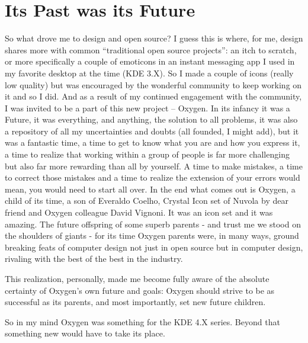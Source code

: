 \section*{Its Past was its Future}
So what drove me to design and open source? 
I guess this is where, for me, design shares more with common “traditional open source projects”: an itch to scratch, or more specifically a couple of emoticons in an instant messaging app I used in my favorite desktop at the time (KDE 3.X). So I made a couple of icons (really low quality) but was encouraged by the wonderful community to keep working on it and so I did. And as a result of my continued engagement with the community, I was invited to be a part of this new project – Oxygen. In its infancy it was a Future, it was everything, and anything, the solution to all problems, it was also a repository of all my uncertainties and doubts (all founded, I might add), but it was a fantastic time, a time to get to know what you are and how you express it, a time to realize that working within a group of people is far more challenging but also far more rewarding than all by yourself. A time to make mistakes, a time to correct those mistakes and a time to realize the extension of your errors would mean, you would need to start all over.
In the end what comes out is Oxygen, a child of its time, a son of Everaldo Coelho, Crystal Icon set of Nuvola by dear friend and Oxygen colleague David Vignoni. It was an icon set and it was amazing.
The future offspring of some superb parents - and trust me we stood on the shoulders of giants - for its time Oxygen parents were, in many ways, ground breaking feats of computer design not just in open source but in computer design, rivaling with the best of the best in the industry.

This realization, personally, made me become fully aware of the absolute certainty of Oxygen's own future and goals: Oxygen should strive to be as successful as its parents, and most importantly, set new future children.

So in my mind Oxygen was something for the KDE 4.X series. Beyond that something new would have to take its place.  


